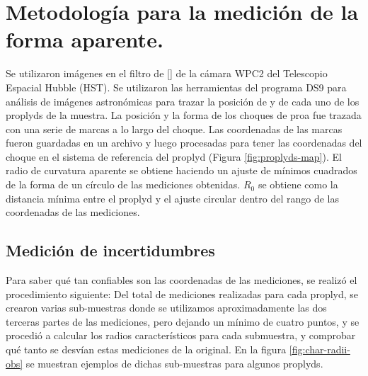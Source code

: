 \section{Metodología para la medición de la forma aparente.}
\label{sec:methodology}
Se utilizaron imágenes en el filtro de [] de la cámara WPC2 del Telescopio Espacial Hubble (HST). Se utilizaron las herramientas del programa DS9 para análisis de imágenes astronómicas para trazar la posición de \thC{} y de cada uno de los proplyds de la muestra. La posición y la forma de los choques de proa fue trazada con una serie de marcas a lo largo del choque. Las coordenadas de las marcas fueron guardadas en un archivo y luego procesadas para tener las coordenadas del choque en el sistema de referencia del proplyd (Figura \ref{fig:proplyds-map}). El radio de curvatura aparente se obtiene haciendo un ajuste de mínimos cuadrados de la forma de un círculo de las mediciones obtenidas. $R_0$ se obtiene como la distancia mínima entre el proplyd y el ajuste circular dentro del rango de las coordenadas de las mediciones. 

\subsection{Medición de incertidumbres}

Para saber qué tan confiables son las coordenadas de las mediciones, se realizó el procedimiento siguiente: Del total de mediciones realizadas para cada proplyd, se crearon varias sub-muestras donde se utilizamos aproximadamente las dos terceras partes de las mediciones, pero dejando un mínimo de cuatro puntos, y se procedió a calcular los radios característicos para cada submuestra, y comprobar qué tanto se desvían estas mediciones de la original. En la figura \ref{fig:char-radii-obs} se muestran ejemplos de dichas sub-muestras para algunos proplyds.


